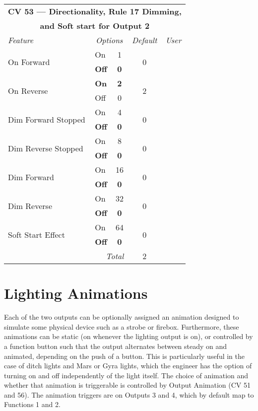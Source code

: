 \documentclass[12pt,letterpaper,draft]{memoir} %
\begin{document}
\label{CV53}
\begin{center}
\begin{tabular}{|l|lc|c|c|}
\hline
\multicolumn{5}{|c|}{\textbf{CV 53 --- Directionality, Rule 17 Dimming,}} \\
\multicolumn{5}{|c|}{\textbf{and Soft start for Output 2}} \\ \hline \hline
\textit{Feature} & \multicolumn{2}{c|}{\textit{Options}} & \textit{Default} & \textit{User} \\ \hline
\multirow{2}{*}{On Forward}	& On			& 1 	& \multirow{2}{*}{0} 	&\\
			& \textbf{Off} 	& \textbf{0} 			& 				& \\ \hline
\multirow{2}{*}{On Reverse}	& \textbf{On}	& \textbf{2} 			& \multirow{2}{*}{2} 	&\\
			& Off 		& 0 	& 	& \\ \hline
\multirow{2}{*}{Dim Forward Stopped}		& On		& 4 			& \multirow{2}{*}{0} 	&\\
			& \textbf{Off} 	& \textbf{0} 	& 				& \\ \hline
\multirow{2}{*}{Dim Reverse Stopped}		& On			& 8 			& \multirow{2}{*}{0} 	&\\
			& \textbf{Off} 	& \textbf{0} 	& 				& \\ \hline
\multirow{2}{*}{Dim Forward}	& On			& 16 			& \multirow{2}{*}{0} 	&\\
			& \textbf{Off} 	& \textbf{0} 	& 				& \\ \hline
\multirow{2}{*}{Dim Reverse}	& On			& 32 			& \multirow{2}{*}{0} 	&\\
			& \textbf{Off} 	& \textbf{0} 	& 				& \\ \hline
\multirow{2}{*}{Soft Start Effect}	& On			& 64 			& \multirow{2}{*}{0} 	&\\
			& \textbf{Off} 	& \textbf{0} 	& 				& \\ \hline\hline

\multicolumn{3}{|r|}{\textit{Total}} & 2 &\\ \hline
\end{tabular}
\end{center}

\section{Lighting Animations}

Each of the two outputs can be optionally assigned an animation designed to simulate some physical device such as a strobe or firebox. Furthermore, these animations can be static (on whenever the lighting output is on), or controlled by a function button such that the output alternates between steady on and animated, depending on the push of a button. This is particularly useful in the case of ditch lights and Mars or Gyra lights, which the engineer has the option of turning on and off independently of the light itself. The choice of animation and whether that animation is triggerable is controlled by Output Animation (CV 51 and 56). The animation triggers are on Outputs 3 and 4, which by default map to Functions 1 and 2.
\end{document}
